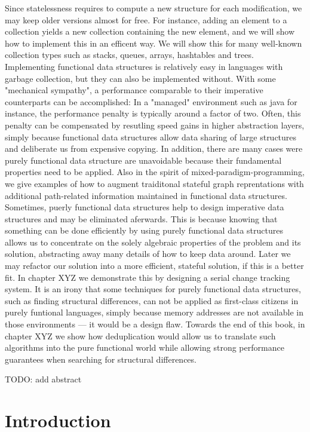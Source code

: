 \documentclass{book}
\begin{document}
Since statelessness requires to compute a new structure for each modification, we may keep older versions almost for free. For instance, adding an element to a collection yields a new collection containing the new element, and we will show how to implement this in an efficent way. We will show this for many well-known collection types such as stacks, queues, arrays, hashtables and trees. Implementing functional data structures is relatively easy in languages with garbage collection, but they can also be implemented without. With some "mechanical sympathy", a performance comparable to their imperative counterparts can be accomplished: In a "managed" environment such as java for instance,  the performance penalty is typically around a factor of two. Often, this penalty can be compensated by resutling speed gains in higher abstraction layers, simply because functional data structures allow data sharing of large structures and deliberate us from expensive copying. In addition, there are many cases were purely functional data structure are unavoidable because their
fundamental properties need to be applied.  Also in the spirit of mixed-paradigm-programming, we give examples of how to augment traiditonal stateful graph reprentations with additional path-related information maintained in functional data structures.
Sometimes, puerly functional data structures help to design imperative data structures and may be eliminated aferwards. This is because knowing that something can be done efficiently by using purely functional data structures allows us to concentrate on the solely algebraic properties of the problem and its solution, abstracting away many details of how to keep data around. Later we may  refactor our solution into a more efficient, stateful solution, if this is a better fit. In chapter XYZ we demonstrate this by designing a serial change tracking system. 
 It is an irony that some techniques for purely functional data structures, such as finding structural differences,  can not be applied as first-class citizens in purely funtional languages, simply because memory addresses are not available in those environments --- it would be a design flaw. Towards the end of this book, in chapter XYZ we show how  deduplication would allow us to translate such algorithms into the pure functional world while allowing strong performance guarantees when searching for structural differences. 

TODO: add abstract

\chapter{Introduction}
\end{document}
